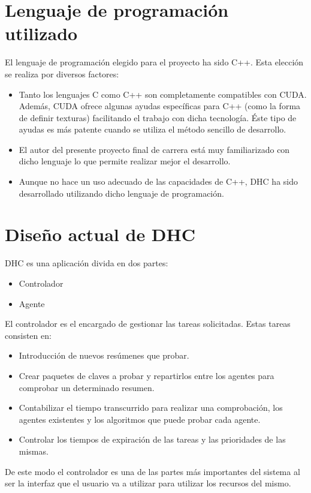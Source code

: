 \section{Lenguaje de programación utilizado}
El lenguaje de programación elegido para el proyecto ha sido C++. Esta elección se realiza por diversos factores:

\begin{itemize}
	\item Tanto los lenguajes C como C++ son completamente compatibles con CUDA. Además, CUDA ofrece algunas ayudas específicas para C++ (como la forma de definir texturas) facilitando el trabajo con dicha tecnología. Éste tipo de ayudas es más patente cuando se utiliza el método sencillo de desarrollo.
	\item El autor del presente proyecto final de carrera está muy familiarizado con dicho lenguaje lo que permite realizar mejor el desarrollo.
	\item Aunque no hace un uso adecuado de las capacidades de C++, DHC ha sido desarrollado utilizando dicho lenguaje de programación.
\end{itemize}

\section{Diseño actual de DHC}

DHC es una aplicación divida en dos partes:
\begin{itemize}
	\item Controlador
	\item Agente
\end{itemize}

El controlador es el encargado de gestionar las tareas solicitadas. Estas tareas consisten en:
\begin{itemize}
	\item Introducción de nuevos resúmenes que probar.
	\item Crear paquetes de claves a probar y repartirlos entre los agentes para comprobar un determinado resumen.
	\item Contabilizar el tiempo transcurrido para realizar una comprobación, los agentes existentes y los algoritmos que puede probar cada agente.
	\item Controlar los tiempos de expiración de las tareas y las prioridades de las mismas.
\end{itemize}

De este modo el controlador es una de las partes más importantes del sistema al ser la interfaz que el usuario va a utilizar para utilizar los recursos del mismo.


